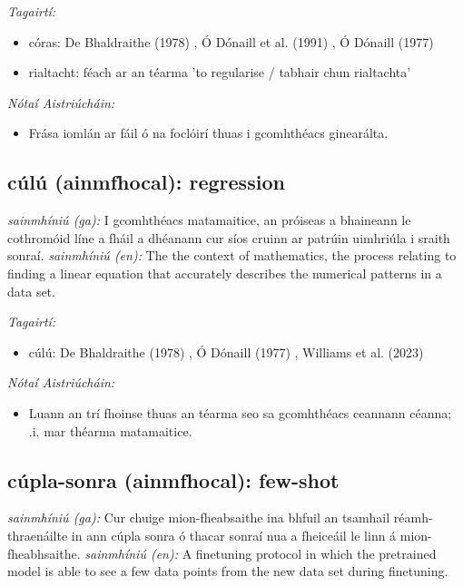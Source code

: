 \documentclass{article}
\begin{document}
 \noindent \textit{Tagairtí:}
\begin{itemize}
	\item córas: De Bhaldraithe (1978) \cite{de-bhaldraithe}, Ó Dónaill et al. (1991) \cite{focloir-beag}, Ó Dónaill (1977) \cite{odonaill}
	\item rialtacht: féach ar an téarma 'to regularise / tabhair chun rialtachta'
\end{itemize}

 \noindent \textit{Nótaí Aistriúcháin:}
\begin{itemize}
	\item Frása iomlán ar fáil ó na foclóirí thuas i gcomhthéacs ginearálta.
\end{itemize}


\subsection*{cúlú (ainmfhocal): regression} 
 \noindent \textit{sainmhíniú (ga):} I gcomhthéacs matamaitice, an próiseas a bhaineann le cothromóid líne a fháil a dhéanann cur síos cruinn ar patrúin uimhriúla i sraith sonraí.
\newline\newline
 \noindent \textit{sainmhíniú (en):} The the context of mathematics, the process relating to finding a linear equation that accurately describes the numerical patterns in a data set.
\newline

 \noindent \textit{Tagairtí:}
\begin{itemize}
	\item cúlú: De Bhaldraithe (1978) \cite{de-bhaldraithe}, Ó Dónaill (1977) \cite{odonaill}, Williams et al. (2023) \cite{storchiste}
\end{itemize}

 \noindent \textit{Nótaí Aistriúcháin:}
\begin{itemize}
	\item Luann an trí fhoinse thuas an téarma seo sa gcomhthéacs ceannann céanna; .i. mar théarma matamaitice.
\end{itemize}


\subsection*{cúpla-sonra (ainmfhocal): few-shot} 
 \noindent \textit{sainmhíniú (ga):} Cur chuige mion-fheabsaithe ina bhfuil an tsamhail réamh-thraenáilte in ann cúpla sonra ó thacar sonraí nua a fheiceáil le linn á mion-fheabhsaithe.
\newline\newline
 \noindent \textit{sainmhíniú (en):} A finetuning protocol in which the pretrained model is able to see a few data points from the new data set during finetuning.
\newline
\end{document}
